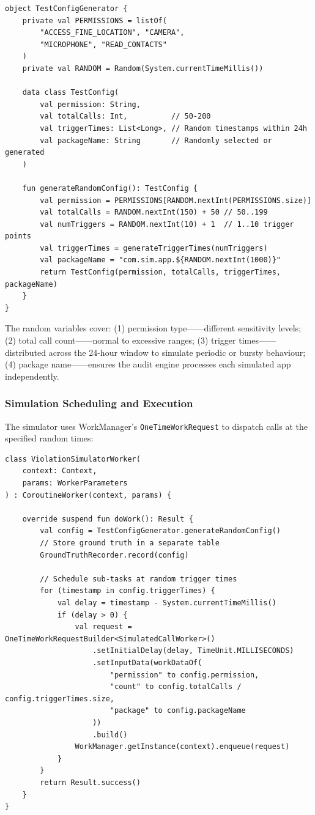 \begin{lstlisting}[caption=Random configuration generation]
object TestConfigGenerator {
    private val PERMISSIONS = listOf(
        "ACCESS_FINE_LOCATION", "CAMERA", 
        "MICROPHONE", "READ_CONTACTS"
    )
    private val RANDOM = Random(System.currentTimeMillis())
    
    data class TestConfig(
        val permission: String,
        val totalCalls: Int,          // 50-200
        val triggerTimes: List<Long>, // Random timestamps within 24h
        val packageName: String       // Randomly selected or generated
    )
    
    fun generateRandomConfig(): TestConfig {
        val permission = PERMISSIONS[RANDOM.nextInt(PERMISSIONS.size)]
        val totalCalls = RANDOM.nextInt(150) + 50 // 50..199
        val numTriggers = RANDOM.nextInt(10) + 1  // 1..10 trigger points
        val triggerTimes = generateTriggerTimes(numTriggers)
        val packageName = "com.sim.app.${RANDOM.nextInt(1000)}"
        return TestConfig(permission, totalCalls, triggerTimes, packageName)
    }
}
\end{lstlisting}

The random variables cover: (1) permission type——different sensitivity levels; (2) total call count——normal to excessive ranges; (3) trigger times——distributed across the 24-hour window to simulate periodic or bursty behaviour; (4) package name——ensures the audit engine processes each simulated app independently.

\subsubsection{Simulation Scheduling and Execution}
The simulator uses WorkManager's \texttt{OneTimeWorkRequest} to dispatch calls at the specified random times:

\begin{lstlisting}[caption=Violation simulator worker]
class ViolationSimulatorWorker(
    context: Context, 
    params: WorkerParameters
) : CoroutineWorker(context, params) {
    
    override suspend fun doWork(): Result {
        val config = TestConfigGenerator.generateRandomConfig()
        // Store ground truth in a separate table
        GroundTruthRecorder.record(config)
        
        // Schedule sub-tasks at random trigger times
        for (timestamp in config.triggerTimes) {
            val delay = timestamp - System.currentTimeMillis()
            if (delay > 0) {
                val request = OneTimeWorkRequestBuilder<SimulatedCallWorker>()
                    .setInitialDelay(delay, TimeUnit.MILLISECONDS)
                    .setInputData(workDataOf(
                        "permission" to config.permission,
                        "count" to config.totalCalls / config.triggerTimes.size,
                        "package" to config.packageName
                    ))
                    .build()
                WorkManager.getInstance(context).enqueue(request)
            }
        }
        return Result.success()
    }
}
\end{lstlisting}

